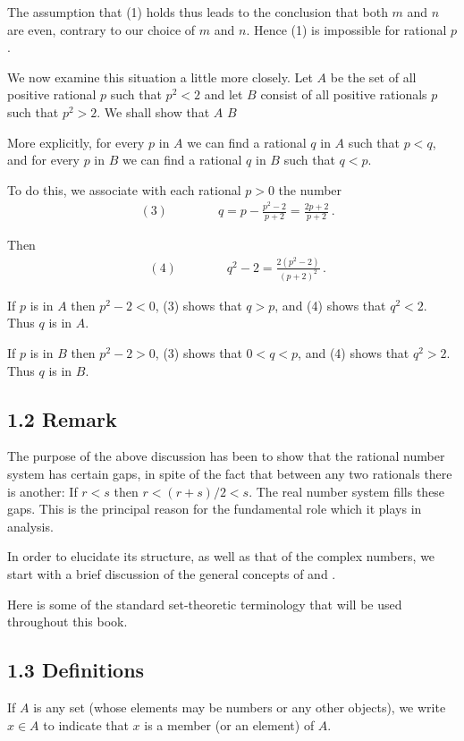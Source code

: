 The assumption that (1) holds thus leads to the conclusion that both $m$ and $n$ are even, contrary to our choice of $m$ and $n$. Hence (1) is impossible for rational $p$. 

We now examine this situation a little more closely. Let $A$ be the set of all positive rational $p$ such that $p^2 < 2$ and let $B$ consist of all positive rationals $p$ such that $p^2 > 2$. We shall show that $A$  $B$ 

More explicitly, for every $p$ in $A$ we can find a rational $q$ in $A$ such that $p < q$, and for every $p$ in $B$ we can find a rational $q$ in $B$ such that $q < p$. 

To do this, we associate with each rational $p > 0$ the number 
\begin{align*}
&(3) \quad\quad\quad\quad q = p - \frac{p^2 - 2}{p + 2} = \frac{2p + 2}{p + 2}\,.
\end{align*}

Then 
\begin{align*}
&(4) \quad\quad\quad\quad q^2 - 2 = \frac{2 (p^2 - 2)}{(p + 2)^2}\,.
\end{align*}

If $p$ is in $A$ then $p^2 - 2 < 0$, (3) shows that $q > p$, and (4) shows that $q^2 < 2$. Thus $q$ is in $A$. 

If $p$ is in $B$ then $p^2 -2 > 0$, (3) shows that $0 < q < p$, and (4) shows that $q^2 > 2$. Thus $q$ is in $B$. 

\subsection*{1.2 Remark}
The purpose of the above discussion has been to show that the rational number system has certain gaps, in spite of the fact that between any two rationals there is another: If $r < s$ then $r < (r + s)/2 < s$. The real number system fills these gaps. This is the principal reason for the fundamental role which it plays in analysis. 

In order to elucidate its structure, as well as that of the complex numbers, we start with a brief discussion of the general concepts of  and .

Here is some of the standard set-theoretic terminology that will be used throughout this book. 

\subsection*{1.3 Definitions}
If $A$ is any set (whose elements may be numbers or any other objects), we write $x \in A$ to indicate that $x$ is a member (or an element) of $A$. 

